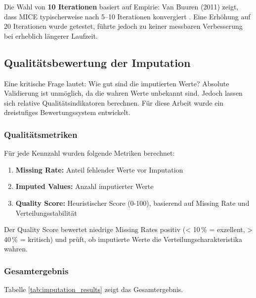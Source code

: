 Die Wahl von \textbf{10 Iterationen} basiert auf Empirie: Van Buuren (2011) zeigt, dass MICE typischerweise nach 5--10 Iterationen konvergiert \parencite{vanbuuren2011mice}. Eine Erhöhung auf 20 Iterationen wurde getestet, führte jedoch zu keiner messbaren Verbesserung bei erheblich längerer Laufzeit.

\subsection{Qualitätsbewertung der Imputation}

Eine kritische Frage lautet: Wie gut sind die imputierten Werte? Absolute Validierung ist unmöglich, da die wahren Werte unbekannt sind. Jedoch lassen sich relative Qualitätsindikatoren berechnen. Für diese Arbeit wurde ein dreistufiges Bewertungssystem entwickelt.

\subsubsection{Qualitätsmetriken}

Für jede Kennzahl wurden folgende Metriken berechnet:

\begin{enumerate}[topsep=0.2\baselineskip]
    \item \textbf{Missing Rate:} Anteil fehlender Werte vor Imputation
    \item \textbf{Imputed Values:} Anzahl imputierter Werte
    \item \textbf{Quality Score:} Heuristischer Score (0-100), basierend auf Missing Rate und Verteilungsstabilität
\end{enumerate}

Der Quality Score bewertet niedrige Missing Rates positiv (< 10\,\% = exzellent, > 40\,\% = kritisch) und prüft, ob imputierte Werte die Verteilungscharakteristika wahren.

\subsubsection{Gesamtergebnis}

Tabelle \ref{tab:imputation_results} zeigt das Gesamtergebnis.

